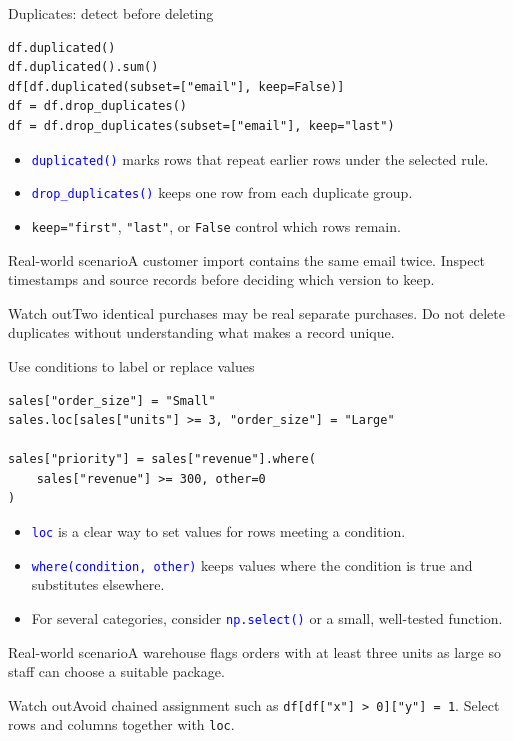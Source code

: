 \documentclass[aspectratio=169,10pt]{beamer}
\newcommand{\scenario}[1]{\begin{block}{Real-world scenario}#1\end{block}}
\newcommand{\pitfall}[1]{\begin{alertblock}{Watch out}#1\end{alertblock}}
\newcommand{\method}[1]{\texttt{\textcolor{Blue}{#1}}}
\begin{document}
\begin{frame}[fragile]{Duplicates: detect before deleting}
\begin{lstlisting}
df.duplicated()
df.duplicated().sum()
df[df.duplicated(subset=["email"], keep=False)]
df = df.drop_duplicates()
df = df.drop_duplicates(subset=["email"], keep="last")
\end{lstlisting}
\begin{itemize}
\item \method{duplicated()} marks rows that repeat earlier rows under the selected rule.
\item \method{drop\_duplicates()} keeps one row from each duplicate group.
\item \texttt{keep="first"}, \texttt{"last"}, or \texttt{False} control which rows remain.
\end{itemize}
\scenario{A customer import contains the same email twice. Inspect timestamps and source records before deciding which version to keep.}
\pitfall{Two identical purchases may be real separate purchases. Do not delete duplicates without understanding what makes a record unique.}
\end{frame}

\begin{frame}[fragile]{Use conditions to label or replace values}
\begin{lstlisting}
sales["order_size"] = "Small"
sales.loc[sales["units"] >= 3, "order_size"] = "Large"

sales["priority"] = sales["revenue"].where(
    sales["revenue"] >= 300, other=0
)
\end{lstlisting}
\begin{itemize}
\item \method{loc} is a clear way to set values for rows meeting a condition.
\item \method{where(condition, other)} keeps values where the condition is true and substitutes elsewhere.
\item For several categories, consider \method{np.select()} or a small, well-tested function.
\end{itemize}
\scenario{A warehouse flags orders with at least three units as large so staff can choose a suitable package.}
\pitfall{Avoid chained assignment such as \texttt{df[df["x"] > 0]["y"] = 1}. Select rows and columns together with \texttt{loc}.}
\end{frame}
\end{document}
